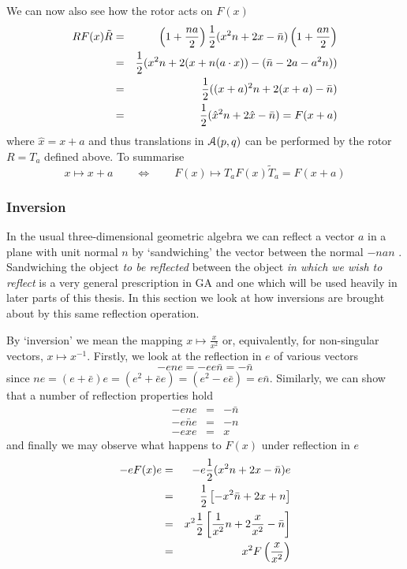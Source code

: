We can now also see how the rotor acts on $F(x)$
%
\begin{eqnarray}
RF(x)\tilde{R} & = & \left(1 + \frac{na}{2}\right)\frac{1}{2}(x^2n + 2x - \bar{n})\left(1 + \frac{an}{2}\right) \nonumber \\
                & = &  \frac{1}{2}(x^2n + 2(x + n(a\cdot x)) - (\bar{n} - 2a - a^2n))   \nonumber \\
                & = &  \frac{1}{2}((x+a)^2n + 2(x+a) - \bar{n}) \nonumber \\
                & = &  \frac{1}{2}(\hat{x}^2 n + 2\hat{x} - \bar{n}) = F(x+a)
\end{eqnarray}
%
where $\hat{x}=x+a$ and thus translations in
${\mathcal{A}}(p,q)$ can be performed by the
rotor  $R=T_a$ defined above. To summarise
 \begin{equation}
x \mapsto x+a \qquad \Leftrightarrow \qquad F(x) \mapsto T_a
F(x) \tilde{T}_a = F(x+a)
\end{equation}

\subsubsection{Inversion}

In the usual three-dimensional geometric algebra we can reflect a vector $a$
in a plane with unit normal $n$ by `sandwiching' the vector between the
normal $-nan$ \cite{IJCV98}. Sandwiching the object \emph{to be reflected}
between the object \emph{in which we wish to reflect} is a very general
prescription in GA and one which will be used heavily in later parts of this
thesis.  In this section we look at how inversions are brought about by this
same reflection operation.

By `inversion' we mean the mapping $x \mapsto \frac{x}{x^2}$ or,
equivalently, for non-singular vectors, $x \mapsto x^{-1}$. Firstly, we look 
at the reflection in $e$ of various vectors
%
\[ -ene  = -ee\bar{n} = -\bar{n} \] 
since $ne = (e+\bar{e})e=(e^2+\bar{e}e)= (e^2 - e\bar{e}) = e\bar{n}$. 
Similarly, we can show that a number of reflection properties hold
%
\begin{eqnarray} -ene & = &  -\bar{n}  \\ -e\bar{n}e & = &  -{n}  \\ -exe & = &
x \end{eqnarray}
%
and finally we may observe what happens to $F(x)$ under reflection in $e$
%
\begin{eqnarray} -eF(x)e & = &  -e\frac{1}{2}(x^2n + 2x - \bar{n})e  \nonumber \\ & = &
\frac{1}{2}\left[-x^2\bar{n} + 2x + n\right] \nonumber \\ & = &  x^2\frac{1}{2}\left[
\frac{1}{x^2}n + 2\frac{x}{x^2} - \bar{n}\right] \nonumber \\ & = &  x^2
F\left(\frac{x}{x^2}\right) \end{eqnarray}
%

